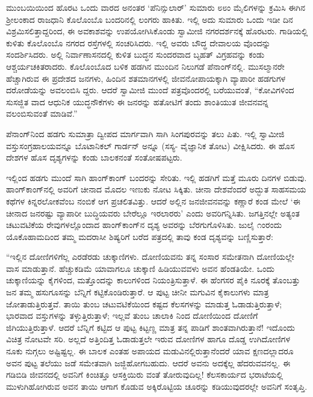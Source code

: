 ಮುಂಬಯಿಯಿಂದ ಹೊರಟ ಒಂದು ವಾರದ ಅನಂತರ ‘ಪೆನಿನ್ಸುಲಾರ್​’ ಸುಮಾರು ೮೮ಂ ಮೈಲಿಗಳನ್ನು ಕ್ರಮಿಸಿ ಈಗಿನ ಶ್ರೀಲಂಕಾದ ರಾಜಧಾನಿ ಕೊಲೊಂಬೊ ಬಂದರಿನಲ್ಲಿ ಲಂಗರು ಹಾಕಿತು. ಇಲ್ಲಿ ಅದು ಸುಮಾರು ಒಂದು ಇಡೀ ದಿನ ವಿಶ್ರಮಿಸಲಿತ್ತಾದ್ದರಿಂದ, ಈ ಅವಕಾಶವನ್ನು ಉಪಯೋಗಿಸಿಕೊಂಡು ಸ್ವಾಮೀಜಿ ನಗರದರ್ಶನಕ್ಕೆ ಹೊರಟರು. ಗಾಡಿಯಲ್ಲಿ ಕುಳಿತು ಕೊಲೊಂಬೊ ನಗರದ ರಸ್ತೆಗಳಲ್ಲಿ ಸಂಚರಿಸಿದರು. ಇಲ್ಲಿ ಅವರು ಬೌದ್ಧ ದೇವಾಲಯ ವೊಂದನ್ನು ಸಂದರ್ಶಿಸಿದರು. ಅಲ್ಲಿ ನಿರ್ವಾಣಾಸನದಲ್ಲಿ ಕುಳಿತ ಬುದ್ಧನ ಸುಂದರವಾದ ಬೃಹತ್ ವಿಗ್ರಹವನ್ನು ಕಂಡು ಆಶ್ಚರ್ಯಚಕಿತರಾದರು. ಕೊಲೊಂಬೊದ ಬಳಿಕ ಹಡಗಿನ ಮುಂದಿನ ನಿಲುಗಡೆ ಪೆನಾಂಗ್​ನಲ್ಲಿ. ಮುಸಲ್ಮಾನರೇ ಹೆಚ್ಚಾಗಿರುವ ಈ ಪ್ರದೇಶದ ಜನಗಳು, ಹಿಂದಿನ ಶತಮಾನಗಳಲ್ಲಿ ಜೀವನೋಪಾಯಕ್ಕಾಗಿ ವ್ಯಾಪಾರೀ ಹಡಗುಗಳ ದರೋಡೆಯನ್ನು ಅವಲಂಬಿಸಿ ದ್ದರು. ಆದರೆ ಸ್ವಾಮೀಜಿ ಮುಂದೆ ಪತ್ರವೊಂದರಲ್ಲಿ ಬರೆಯುವಂತೆ, “ಕೋವಿಗಳಿಂದ ಸುಸಜ್ಜಿತ ವಾದ ಆಧುನಿಕ ಯುದ್ಧನೌಕೆಗಳು ಈ ಜನರನ್ನು ಹತೋಟಿಗೆ ತಂದು ಶಾಂತಿಯುತ ಜೀವನವನ್ನ ವಲಂಬಿಸುವಂತೆ ಮಾಡಿವೆ.”

ಪೆನಾಂಗ್​ನಿಂದ ಹಡಗು ಸುಮಾತ್ರಾ ದ್ವೀಪದ ಮಾರ್ಗವಾಗಿ ಸಾಗಿ ಸಿಂಗಪುರವನ್ನು ತಲು ಪಿತು. ಇಲ್ಲಿ ಸ್ವಾಮೀಜಿ ವಸ್ತುಸಂಗ್ರಹಾಲಯವನ್ನೂ ಬೊಟಾನಿಕಲ್ ಗಾರ್ಡನ್ ಅನ್ನೂ (ಸಸ್ಯ- ವೈಜ್ಞಾನಿಕ ತೋಟ) ವೀಕ್ಷಿಸಿದರು. ಈ ಹೊಸ ದೇಶಗಳ ಹೊಸ ದೃಶ್ಯಗಳನ್ನು ಕಂಡು ಬಾಲಕನಂತೆ ಸಂತೋಷಪಟ್ಟರು.

ಇಲ್ಲಿಂದ ಹಡಗು ಮುಂದೆ ಸಾಗಿ ಹಾಂಗ್​ಕಾಂಗ್ ಬಂದರನ್ನು ಸೇರಿತು. ಇಲ್ಲಿ ಹಡಗಿಗೆ ಮತ್ತೆ ಮೂರು ದಿನಗಳ ಬಿಡುವು. ಹಾಂಗ್​ಕಾಂಗ್​ನಲ್ಲಿ ಅವರಿಗೆ ಚೀನಾದ ಮೊದಲ ಇಣುಕು ನೋಟ ಸಿಕ್ಕಿತು. ಚೀನಾ ದೇಶವೆಂದರೆ ಅದ್ಭುತ ಸಾಹಸಮಯ ಕಥೆಗಳ ಕಿನ್ನರಲೋಕವೆಂಬ ನಂಬಿಕೆ ಆಗ ಪ್ರಚಲಿತವಿತ್ತು. ಆದರೆ ಅಲ್ಲಿನ ಜನಜೀವನವನ್ನು ಕಣ್ಣಾರೆ ಕಂಡ ಮೇಲೆ ‘ಈ ಚೀನಾದ ಜನರಷ್ಟು ವ್ಯಾಪಾರೀ ಬುದ್ಧಿಯವರು ಬೇರೆಲ್ಲೂ ಇರಲಾರರು’ ಎಂದು ಅವರಿಗನ್ನಿಸಿತು. ಜಗತ್ತಿನಲ್ಲೇ ಅತ್ಯಂತ ಚಟುವಟಿಕೆಯ ರೇವುಗಳಲ್ಲೊಂದಾದ ಹಾಂಗ್​ಕಾಂಗ್​ನ ದೃಶ್ಯ ಅವರನ್ನು ಬೆರಗುಗೊಳಿಸಿತು. ಜುಲೈ ೧ಂರಂದು ಯೊಕೊಹಾಮದಿಂದ ತಮ್ಮ ಮದರಾಸೀ ಶಿಷ್ಯರಿಗೆ ಬರೆದ ಪತ್ರದಲ್ಲಿ ತಾವು ಕಂಡ ದೃಶ್ಯವನ್ನು ಬಣ್ಣಿಸುತ್ತಾರೆ:

“ಇಲ್ಲಿನ ದೋಣಿಗಳಿಗೆಲ್ಲ ಎರಡೆರಡು ಚುಕ್ಕಾಣಿಗಳು. ದೋಣಿಯವನು ತನ್ನ ಸಂಸಾರ ಸಮೇತನಾಗಿ ದೋಣಿಯಲ್ಲೇ ವಾಸ ಮಾಡುತ್ತಾನೆ. ಹೆಚ್ಚುಕಡಿಮೆ ಯಾವಾಗಲೂ ಚುಕ್ಕಾಣಿ ಹಿಡಿಯುವವಳು ಅವನ ಹೆಂಡತಿಯೇ. ಒಂದು ಚುಕ್ಕಾಣಿಯನ್ನು ಕೈಗಳಿಂದ, ಮತ್ತೊಂದನ್ನು ಕಾಲುಗಳಿಂದ ನಿಯಂತ್ರಿಸುತ್ತಾಳೆ. ಈ ಹೆಂಗಸರ ಪೈಕಿ ನೂರಕ್ಕೆ ತೊಂಬತ್ತು ಜನ ತಮ್ಮ ಹಸುಗೂಸನ್ನು ಬೆನ್ನಿಗೆ ಕಟ್ಟಿಕೊಂಡಿರುತ್ತಾರೆ. ಆ ಪುಟ್ಟ ಚೀನೀ ಮಗುವಿನ ಕೈಕಾಲುಗಳು ಮಾತ್ರ ಜೋತಾಡುತ್ತಿರುತ್ತವೆ. ತಾಯಿ ತುಂಬ ಚಟುವಟಿಕೆಯಿಂದ ಕಷ್ಟದ ಕೆಲಸಗಳನ್ನು ಮಾಡುತ್ತ ಓಡಾಡುತ್ತಿರುತ್ತಾಳೆ; ಭಾರವಾದ ವಸ್ತುಗಳನ್ನು ತಳ್ಳುತ್ತಿರುತ್ತಾಳೆ; ಇಲ್ಲವೆ ತುಂಬ ಚಾಲಾಕಿ ನಿಂದ ದೋಣಿಯಿಂದ ದೋಣಿಗೆ ಜಿಗಿಯುತ್ತಿರುತ್ತಾಳೆ. ಆದರೆ ಬೆನ್ನಿಗೆ ಕಟ್ಟಿದ ಆ ಪುಟ್ಟ ಕಿಟ್ಟಣ್ಣ ಮಾತ್ರ ತನ್ನ ಪಾಡಿಗೆ ಶಾಂತವಾಗಿರುತ್ತಾನೆ! ಇದೊಂದು ವಿಚಿತ್ರ ನೋಟವೇ ಸರಿ. ಅಲ್ಲದೆ ಅತ್ತಿಂದಿತ್ತ ಓಡಾಡುತ್ತಲೇ ಇರುವ ದೋಣಿಗಳ ಹಾಗೂ ದೊಡ್ಡ ಉಗಿದೋಣಿಗಳ ನೂಕು ನುಗ್ಗಲು ಅಷ್ಟಿಷ್ಟಲ್ಲ. ಈ ಬಾಲಕ ಎಂತಹ ಅಪಾಯದ ಮಡುವಿನಲ್ಲಿರುತ್ತಾನೆಂದರೆ ಯಾವ ಕ್ಷಣದಲ್ಲಾದರೂ ಅವನ ಪುಟ್ಟ ತಲೆಯು ಜಡೆ ಸಮೇತವಾಗಿ ಜಜ್ಜಿಹೋಗಬಹುದು. ಆದರೆ ಅವನು ಅದಕ್ಕೆಲ್ಲ ಹೆದರುವವನಲ್ಲ. ಈ ಗಡಿಬಿಡಿ ಜೀವನದಲ್ಲಿ ಅವನಿಗೆ ಕಿಂಚಿತ್ತೂ ಆಸಕ್ತಿಯಿರು ವಂತೆ ತೋರುವುದಿಲ್ಲ! ಕೆಲಸಕಾರ್ಯದ ಭರಾಟೆಯಲ್ಲಿ ಮುಳುಗಿಹೋಗಿರುವ ಅವನ ತಾಯಿ ಆಗಾಗ ಕೊಡುವ ಅಕ್ಕಿರೊಟ್ಟಿಯ ಚೂರನ್ನು ಕಡಿಯುವುದರಲ್ಲೇ ಅವನಿಗೆ ಸಂತೃಪ್ತಿ.

